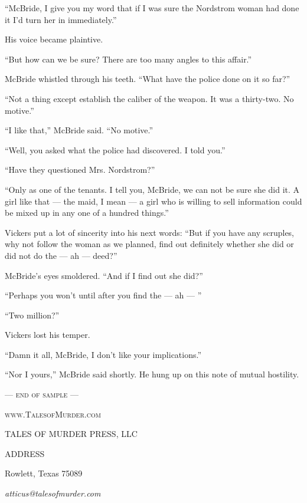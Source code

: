 \documentclass{novel}
\begin{document}
“McBride, I give you my word that if I was sure the Nordstrom woman had done it I’d turn her in immediately.” 

His voice became plaintive. 

“But how can we be sure? There are too many angles to this affair.”

McBride whistled through his teeth. “What have the police done on it so far?”

“Not a thing except establish the caliber of the weapon. It was a thirty-two. No motive.”

“I like that,” McBride said. “No motive.”

“Well, you asked what the police had discovered. I told you.”

“Have they questioned Mrs. Nordstrom?”

“Only as one of the tenants. I tell you, McBride, we can not be sure she did it. A girl like that — the maid, I mean — a girl who is willing to sell information could be mixed up in any one of a hundred things.”

Vickers put a lot of sincerity into his next words: “But if you have any scruples, why not follow the woman as we planned, find out definitely whether she did or did not do the — ah — deed?”

McBride’s eyes smoldered. “And if I find out she did?”

“Perhaps you won’t until after you find the — ah — ”

“Two million?”

Vickers lost his temper.

“Damn it all, McBride, I don’t like your implications.”

“Nor I yours,” McBride said shortly. He hung up on this note of mutual hostility.

\null\null\null

{\centering\textsc{--- end of sample ---}\par}

\thispagestyle{empty}

\clearpage

\vspace*{4\nbs}

\par

\null


\centering\textsc{www.TalesofMurder.com}\par

\vspace*{8\nbs}

\centering{}

TALES OF MURDER PRESS, LLC

\null

\scshape{ADDRESS

Rowlett, Texas 75089}

\null

\textit{atticus@talesofmurder.com}
\thispagestyle{empty}
\vfill
\end{document}
